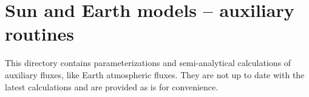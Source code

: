 \section{Sun and Earth models -- auxiliary routines}

This directory contains parameterizations and semi-analytical calculations of auxiliary fluxes, like Earth atmospheric fluxes. They are not up to date with the latest calculations and are provided as is for convenience.
